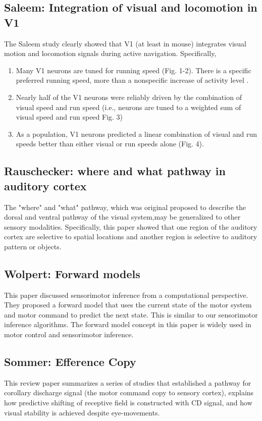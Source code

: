 \documentclass{article} %
\begin{document}
\subsection{Saleem: Integration of visual and locomotion in V1}

The Saleem study \cite{Saleem2013} clearly showed that V1 (at least in mouse) 
integrates visual motion and locomotion signals during active navigation. Specifically,

\begin{enumerate}
\item Many V1 neurons are tuned for running speed (Fig. 1-2). There is a specific preferred 
running speed, more than a nonspecific increase of activity level \cite{Niell2010}.
\item Nearly half of the V1 neurons were reliably driven by the combination of visual speed and 
run speed (i.e., neurons are tuned to a weighted sum of visual speed and run speed Fig. 3)
\item As a population, V1 neurons predicted a linear combination of visual and run 
speeds better than either visual or run speeds alone (Fig. 4).
\end{enumerate}

\subsection{Rauschecker: where and what pathway in auditory cortex}

The "where" and "what" pathway, which was original proposed to describe the 
dorsal and ventral pathway of the visual system,may be generalized to other sensory 
modalities. Specifically, this paper \cite{Rauschecker2000} 
showed that one region of the auditory cortex are selective to spatial locations and 
another region is selective to auditory pattern or objects. 


\subsection{Wolpert: Forward models}

This paper \cite{Wolpert1996} discussed sensorimotor inference from a
computational perspective. They proposed a forward model that uses the current
state of the motor system and motor command to predict the next state. This is
similar to our sensorimotor inference algorithms. The forward model concept in
this paper is widely used in motor control and sensorimotor inference.

\subsection{Sommer: Efference Copy}

This review paper \cite{Sommer2006} summarizes a series of studies that
established a  pathway for corollary discharge signal (the motor command copy to
sensory cortex), explains how predictive shifting of receptive field is
constructed with CD signal, and how visual stability is achieved despite
eye-movements.



%

\end{document}
